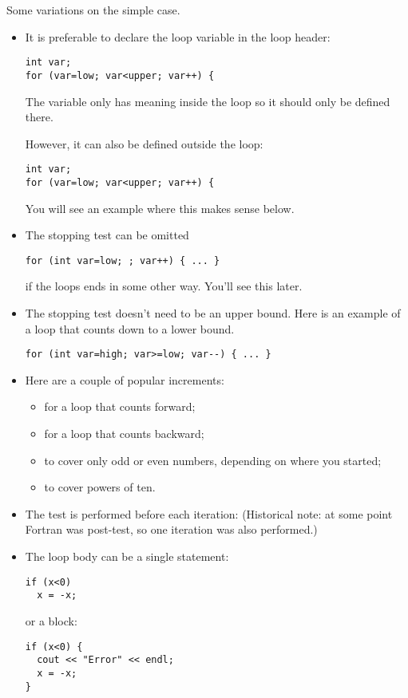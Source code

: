 Some variations on the simple case.
\begin{itemize}
\item It is preferable to declare the loop variable in the loop header:
\begin{verbatim}
int var;
for (var=low; var<upper; var++) {
\end{verbatim}
The variable only has
meaning inside the loop so it should only be defined there.

However, it can also be defined outside the loop:
\begin{verbatim}
int var;
for (var=low; var<upper; var++) {
\end{verbatim}
You will see an example where this makes sense below.
\item The stopping test can be omitted
\begin{verbatim}
for (int var=low; ; var++) { ... }
\end{verbatim}
if the loops ends in some other way. You'll see this later.
\item The stopping test doesn't need to be an upper bound. Here is an
  example of a loop that counts down to a lower bound.
\begin{verbatim}
for (int var=high; var>=low; var--) { ... }
\end{verbatim}
\item Here are a couple of popular increments:
  \begin{itemize}
  \item {} for a loop that counts forward;
  \item {} for a loop that counts backward;
  \item {} to cover only odd or even numbers, depending on
    where you started;
  \item {} to cover powers of ten.
  \end{itemize}
\item The test is performed before each iteration:
  (Historical note: at some point Fortran was post-test, so one
  iteration was also performed.)
\item The loop body can be a single statement:
\begin{verbatim}
if (x<0)
  x = -x;
\end{verbatim}
or a block:
\begin{verbatim}
if (x<0) {
  cout << "Error" << endl;
  x = -x;
}
\end{verbatim}
\end{itemize}

